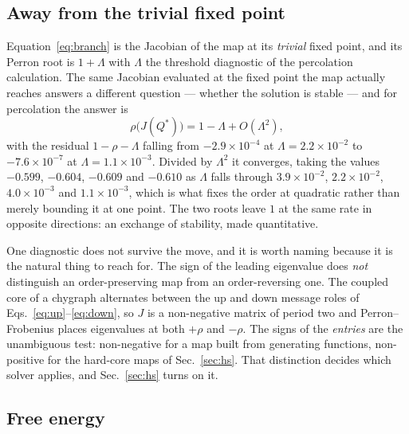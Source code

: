 \documentclass[aps,pre,twocolumn,superscriptaddress,floatfix]{revtex4-2}
\begin{document}
\subsection{Away from the trivial fixed point}
\label{sec:fixedpoint}

Equation~\eqref{eq:branch} is the Jacobian of the map at its \emph{trivial}
fixed point, and its Perron root is $1+\Lambda$ with $\Lambda$ the threshold
diagnostic of the percolation calculation. The same Jacobian evaluated at the
fixed point the map actually reaches answers a different question --- whether
the solution is stable --- and for percolation the answer is
\begin{equation}
  \rho\big(J(Q^{\ast})\big)=1-\Lambda+O(\Lambda^{2}),
  \label{eq:exchange}
\end{equation}
with the residual $1-\rho-\Lambda$ falling from $-2.9\times10^{-4}$ at
$\Lambda=2.2\times10^{-2}$ to $-7.6\times10^{-7}$ at $\Lambda=1.1\times10^{-3}$.
Divided by $\Lambda^{2}$ it converges, taking the values $-0.599$, $-0.604$,
$-0.609$ and $-0.610$ as $\Lambda$ falls through
$3.9\times10^{-2}$, $2.2\times10^{-2}$, $4.0\times10^{-3}$ and
$1.1\times10^{-3}$, which is what fixes the order at quadratic rather than
merely bounding it at one point. The two roots leave $1$ at the same rate in opposite
directions: an exchange of stability, made quantitative.

One diagnostic does not survive the move, and it is worth naming because it is
the natural thing to reach for. The sign of the leading eigenvalue does
\emph{not} distinguish an order-preserving map from an order-reversing one. The
coupled core of a chygraph alternates between the up and down message roles of
Eqs.~\eqref{eq:up}--\eqref{eq:down}, so $J$ is a non-negative matrix of period
two and Perron--Frobenius places eigenvalues at both $+\rho$ and $-\rho$. The
signs of the \emph{entries} are the unambiguous test: non-negative for a map
built from generating functions, non-positive for the hard-core maps of
Sec.~\ref{sec:hs}. That distinction decides which solver applies, and
Sec.~\ref{sec:hs} turns on it.

\subsection{Free energy}
\label{sec:freeenergy}
\end{document}
